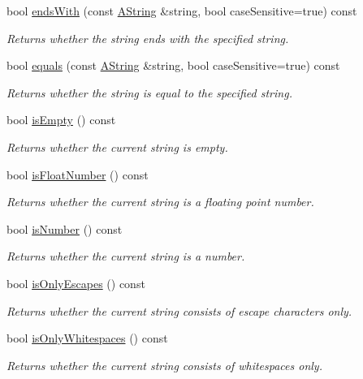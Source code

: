 \begin{DoxyCompactItemize}
bool \mbox{\hyperlink{class_a_string_ae73b26b17b08f56851737b5cf45a21e6}{ends\+With}} (const \mbox{\hyperlink{class_a_string}{A\+String}} \&string, bool case\+Sensitive=true) const
\begin{DoxyCompactList}\small\item\em Returns whether the string ends with the specified string. \end{DoxyCompactList}\item 
bool \mbox{\hyperlink{class_a_string_a783f45da45fb0e7685932d44a188e831}{equals}} (const \mbox{\hyperlink{class_a_string}{A\+String}} \&string, bool case\+Sensitive=true) const
\begin{DoxyCompactList}\small\item\em Returns whether the string is equal to the specified string. \end{DoxyCompactList}\item 
bool \mbox{\hyperlink{class_a_string_ab8146522d4484d8aec3005dbe60dcfef}{is\+Empty}} () const
\begin{DoxyCompactList}\small\item\em Returns whether the current string is empty. \end{DoxyCompactList}\item 
bool \mbox{\hyperlink{class_a_string_a693a5dd685ee812406e6643fd964ec7c}{is\+Float\+Number}} () const
\begin{DoxyCompactList}\small\item\em Returns whether the current string is a floating point number. \end{DoxyCompactList}\item 
bool \mbox{\hyperlink{class_a_string_a8b3516a3c934fde801074ef792f1468b}{is\+Number}} () const
\begin{DoxyCompactList}\small\item\em Returns whether the current string is a number. \end{DoxyCompactList}\item 
bool \mbox{\hyperlink{class_a_string_a7d7f2482f18578ddda0ec825ef58545a}{is\+Only\+Escapes}} () const
\begin{DoxyCompactList}\small\item\em Returns whether the current string consists of escape characters only. \end{DoxyCompactList}\item 
bool \mbox{\hyperlink{class_a_string_a506192a29a529eccacfa3a4dfb1a234b}{is\+Only\+Whitespaces}} () const
\begin{DoxyCompactList}\small\item\em Returns whether the current string consists of whitespaces only. \end{DoxyCompactList}\item 

\end{DoxyCompactItemize}

